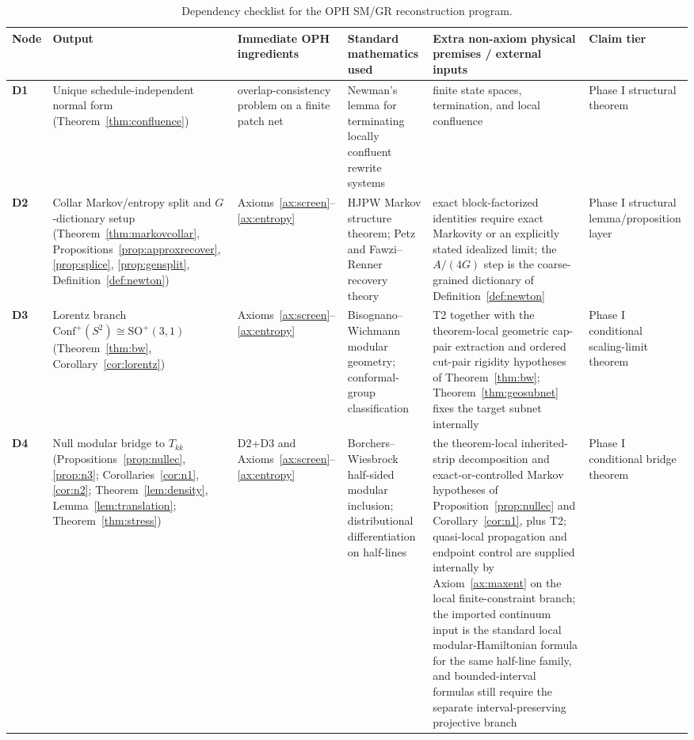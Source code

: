 \documentclass[11pt]{article}
\newcommand{\Conf}{\mathrm{Conf}}
\begin{document}
\begingroup
\tiny
\setlength{\tabcolsep}{1pt}
\begin{longtable}{@{}>{\raggedright\arraybackslash}p{}>{\raggedright\arraybackslash}p{}>{\raggedright\arraybackslash}p{}>{\raggedright\arraybackslash}p{}>{\raggedright\arraybackslash}p{}>{\raggedright\arraybackslash}p{}@{}}
\caption{Dependency checklist for the OPH SM/GR reconstruction program.}\\
\toprule
Node & Output & Immediate OPH ingredients & Standard mathematics used & Extra non-axiom physical premises / external inputs & Claim tier \\
\midrule
\endhead
\bottomrule
\endfoot
\textbf{D1} & Unique schedule-independent normal form (Theorem~\ref{thm:confluence}) & overlap-consistency problem on a finite patch net & Newman's lemma for terminating locally confluent rewrite systems & finite state spaces, termination, and local confluence & Phase I structural theorem \\
\textbf{D2} & Collar Markov/entropy split and \(G\)-dictionary setup (Theorem~\ref{thm:markovcollar}, Propositions~\ref{prop:approxrecover}, \ref{prop:splice}, \ref{prop:gensplit}, Definition~\ref{def:newton}) & Axioms~\ref{ax:screen}--\ref{ax:entropy} & HJPW Markov structure theorem; Petz and Fawzi--Renner recovery theory & exact block-factorized identities require exact Markovity or an explicitly stated idealized limit; the \(A/(4G)\) step is the coarse-grained dictionary of Definition~\ref{def:newton} & Phase I structural lemma/proposition layer \\
\textbf{D3} & Lorentz branch \(\Conf^+(S^2)\cong \mathrm{SO}^+(3,1)\) (Theorem~\ref{thm:bw}, Corollary~\ref{cor:lorentz}) & Axioms~\ref{ax:screen}--\ref{ax:entropy} & Bisognano--Wichmann modular geometry; conformal-group classification & T2 together with the theorem-local geometric cap-pair extraction and ordered cut-pair rigidity hypotheses of Theorem~\ref{thm:bw}; Theorem~\ref{thm:geosubnet} fixes the target subnet internally & Phase I conditional scaling-limit theorem \\
\textbf{D4} & Null modular bridge to \(T_{kk}\) (Propositions~\ref{prop:nullec}, \ref{prop:n3}; Corollaries~\ref{cor:n1}, \ref{cor:n2}; Theorem~\ref{lem:density}, Lemma~\ref{lem:translation}; Theorem~\ref{thm:stress}) & D2+D3 and Axioms~\ref{ax:screen}--\ref{ax:entropy} & Borchers--Wiesbrock half-sided modular inclusion; distributional differentiation on half-lines & the theorem-local inherited-strip decomposition and exact-or-controlled Markov hypotheses of Proposition~\ref{prop:nullec} and Corollary~\ref{cor:n1}, plus T2; quasi-local propagation and endpoint control are supplied internally by Axiom~\ref{ax:maxent} on the local finite-constraint branch; the imported continuum input is the standard local modular-Hamiltonian formula for the same half-line family, and bounded-interval formulas still require the separate interval-preserving projective branch & Phase I conditional bridge theorem \\

\end{longtable}
\end{document}
